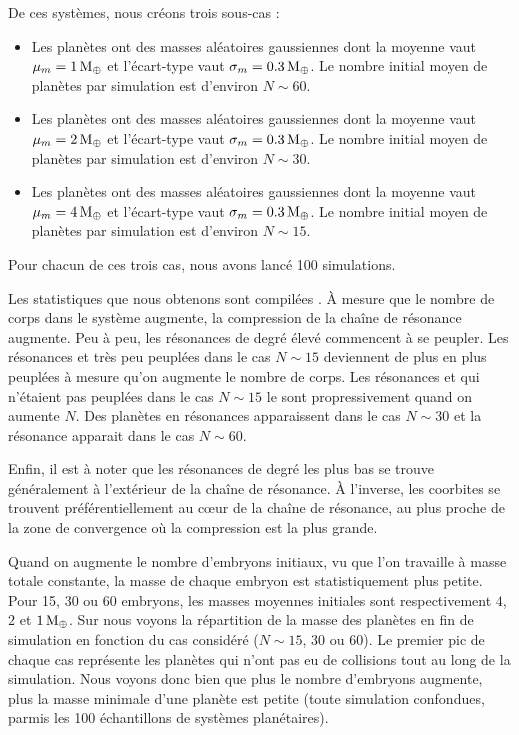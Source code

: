 De ces systèmes, nous créons trois sous-cas :
\begin{itemize}
\item Les planètes ont des masses aléatoires gaussiennes dont la moyenne vaut $\mu_m=1\mathrm{\thinspace M_\oplus}$ et l'écart-type vaut $\sigma_m=0.3\mathrm{\thinspace M_\oplus}$. Le nombre initial moyen de planètes par simulation est d'environ $N\sim 60$.
\item Les planètes ont des masses aléatoires gaussiennes dont la moyenne vaut $\mu_m=2\mathrm{\thinspace M_\oplus}$ et l'écart-type vaut $\sigma_m=0.3\mathrm{\thinspace M_\oplus}$. Le nombre initial moyen de planètes par simulation est d'environ $N\sim 30$.
\item Les planètes ont des masses aléatoires gaussiennes dont la moyenne vaut $\mu_m=4\mathrm{\thinspace M_\oplus}$ et l'écart-type vaut $\sigma_m=0.3\mathrm{\thinspace M_\oplus}$. Le nombre initial moyen de planètes par simulation est d'environ $N\sim 15$.
\end{itemize}

Pour chacun de ces trois cas, nous avons lancé 100 simulations. 

Les statistiques que nous obtenons sont compilées . À mesure que le nombre de corps dans le système augmente, la compression de la chaîne de résonance augmente. Peu à peu, les résonances de degré élevé commencent à se peupler. Les résonances  et  très peu peuplées dans le cas $N\sim 15$ deviennent de plus en plus peuplées à mesure qu'on augmente le nombre de corps. Les résonances  et  qui n'étaient pas peuplées dans le cas $N\sim 15$ le sont propressivement quand on aumente $N$. Des planètes en résonances  apparaissent dans le cas $N\sim 30$ et la résonance  apparait dans le cas $N\sim 60$.

Enfin, il est à noter que les résonances de degré les plus bas se trouve généralement à l'extérieur de la chaîne de résonance. À l'inverse, les coorbites se trouvent préférentiellement au cœur de la chaîne de résonance, au plus proche de la zone de convergence où la compression est la plus grande. 

Quand on augmente le nombre d'embryons initiaux, vu que l'on travaille à masse totale constante, la masse de chaque embryon est statistiquement plus petite. Pour 15, 30 ou 60 embryons, les masses moyennes initiales sont respectivement $4$, $2$ et $1\mathrm{\thinspace M_\oplus}$. Sur  nous voyons la répartition de la masse des planètes en fin de simulation en fonction du cas considéré ($N\sim 15$, 30 ou 60). Le premier pic de chaque cas représente les planètes qui n'ont pas eu de collisions tout au long de la simulation. Nous voyons donc bien que plus le nombre d'embryons augmente, plus la masse minimale d'une planète est petite (toute simulation confondues, parmis les 100 échantillons de systèmes planétaires). 

